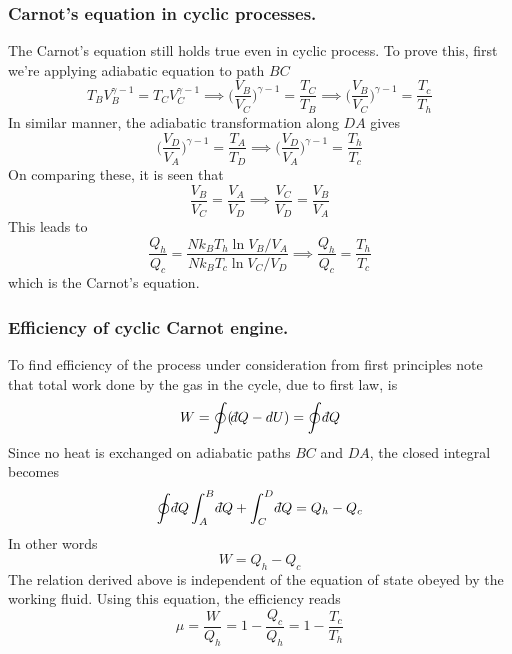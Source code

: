 \documentclass[../../../Main.tex]{subfiles}
\begin{document}
\subsubsection*{Carnot's equation in cyclic processes.} The Carnot's equation still holds true even in cyclic process. To prove this, first we're applying adiabatic equation to path $BC$
\begin{equation*}
    T_BV_B^{\gamma-1}=T_CV_C^{\gamma-1}\implies \biggl(\frac{V_B}{V_C}\biggr)^{\gamma-1}=\frac{T_C}{T_B}\implies\biggl(\frac{V_B}{V_C}\biggr)^{\gamma-1}=\frac{T_c}{T_h}
\end{equation*}
In similar manner, the adiabatic transformation along $ D A$ gives
\begin{equation*}
    \biggl(\frac{V_D}{V_A}\biggr)^{\gamma-1}=\frac{T_A}{T_D}\implies \biggl(\frac{V_D}{V_A}\biggr)^{\gamma-1}=\frac{T_h}{T_c}
\end{equation*}
On comparing these, it is seen that
\begin{equation*}
    \frac{V_B}{V_C}=\frac{V_A}{V_D}\implies\frac{V_C}{V_D}=\frac{V_B}{V_A}
\end{equation*}
This leads to 
\begin{equation*}
    \frac{Q_h}{Q_c}=\frac{Nk_BT_h\ln{V_B}/{V_A}}{Nk_BT_c\ln{V_C}/{V_D}}\implies \frac{Q_h}{Q_c}=\frac{T_h}{T_c}
\end{equation*}
which is the Carnot's equation.

\subsubsection*{Efficiency of cyclic Carnot engine.} To find efficiency of the process under consideration from first principles note that total work done by the gas in the cycle, due to first law, is
\begin{equation*}
    W=\oint(\dbar Q-dU)=\oint \dbar Q
\end{equation*}
Since no heat is exchanged on adiabatic paths $BC$ and $DA$, the closed integral becomes 
\begin{equation*}
    \oint \dbar Q\int_{A}^{B} \dbar Q+\int_{C}^{D} \dbar Q=Q_h-Q_c
\end{equation*}
In other words
\begin{equation*}
    W=Q_h-Q_c
\end{equation*}
The relation derived above is independent of the equation of state obeyed by the working fluid. Using this equation, the efficiency reads 
\begin{equation*}
    \mu=\frac{W}{Q_h}=1-\frac{Q_c}{Q_h}=1-\frac{T_c}{T_h}
\end{equation*}
\end{document}
